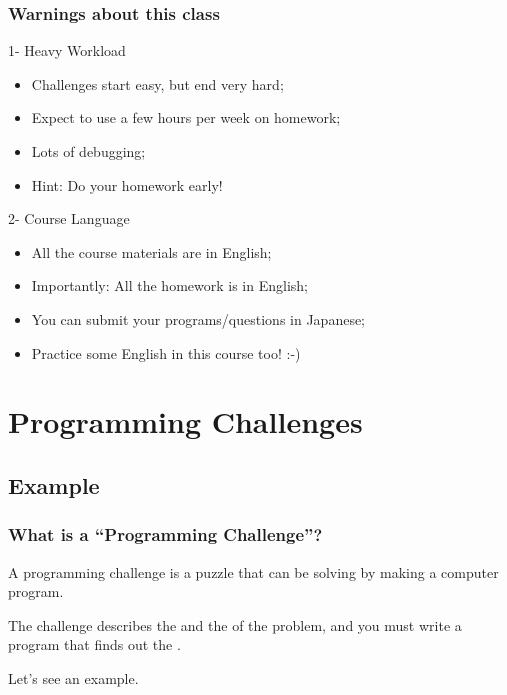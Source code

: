 \documentclass{beamer}
\begin{document}
\begin{frame}
  \frametitle{Warnings about this class}
  \begin{alertblock}{1- Heavy Workload}
    \begin{itemize}
    \item Challenges start easy, but end very hard;
    \item Expect to use a few hours per week on homework;
    \item Lots of debugging;

      \bigskip

    \item Hint: Do your homework early!
    \end{itemize}
  \end{alertblock}

  \begin{alertblock}{2- Course Language}
    \begin{itemize}
    \item All the course materials are in English;
    \item Importantly: All the homework is in English;
    \item You can submit your programs/questions in Japanese;

      \bigskip

    \item Practice some English in this course too! :-)
    \end{itemize}
  \end{alertblock}

\end{frame}

\section{Programming Challenges}
\subsection{Example}

\begin{frame}
  \frametitle{What is a ``Programming Challenge''?}

  A programming challenge is a puzzle that can be solving by making a
  computer program.

  \bigskip

  The challenge describes the  and the
   of the problem, and you must write a program that
  finds out the .

  \bigskip

  Let's see an example.
  
\end{frame}
\end{document}

